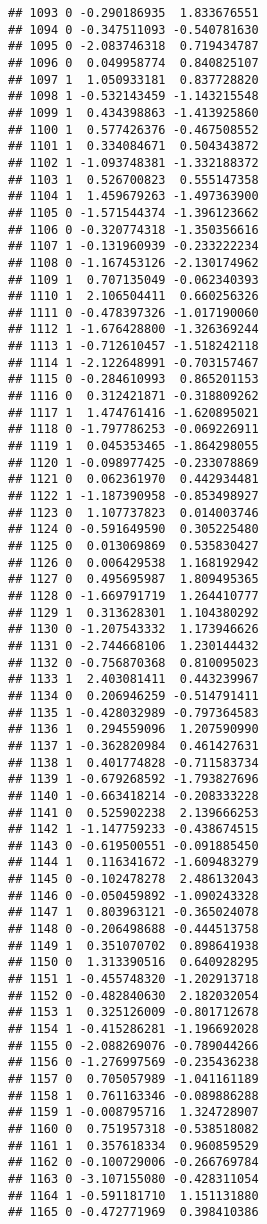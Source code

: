 \documentclass[
]{article}
\begin{document}
\begin{verbatim}
## 1093 0 -0.290186935  1.833676551
## 1094 0 -0.347511093 -0.540781630
## 1095 0 -2.083746318  0.719434787
## 1096 0  0.049958774  0.840825107
## 1097 1  1.050933181  0.837728820
## 1098 1 -0.532143459 -1.143215548
## 1099 1  0.434398863 -1.413925860
## 1100 1  0.577426376 -0.467508552
## 1101 1  0.334084671  0.504343872
## 1102 1 -1.093748381 -1.332188372
## 1103 1  0.526700823  0.555147358
## 1104 1  1.459679263 -1.497363900
## 1105 0 -1.571544374 -1.396123662
## 1106 0 -0.320774318 -1.350356616
## 1107 1 -0.131960939 -0.233222234
## 1108 0 -1.167453126 -2.130174962
## 1109 1  0.707135049 -0.062340393
## 1110 1  2.106504411  0.660256326
## 1111 0 -0.478397326 -1.017190060
## 1112 1 -1.676428800 -1.326369244
## 1113 1 -0.712610457 -1.518242118
## 1114 1 -2.122648991 -0.703157467
## 1115 0 -0.284610993  0.865201153
## 1116 0  0.312421871 -0.318809262
## 1117 1  1.474761416 -1.620895021
## 1118 0 -1.797786253 -0.069226911
## 1119 1  0.045353465 -1.864298055
## 1120 1 -0.098977425 -0.233078869
## 1121 0  0.062361970  0.442934481
## 1122 1 -1.187390958 -0.853498927
## 1123 0  1.107737823  0.014003746
## 1124 0 -0.591649590  0.305225480
## 1125 0  0.013069869  0.535830427
## 1126 0  0.006429538  1.168192942
## 1127 0  0.495695987  1.809495365
## 1128 0 -1.669791719  1.264410777
## 1129 1  0.313628301  1.104380292
## 1130 0 -1.207543332  1.173946626
## 1131 0 -2.744668106  1.230144432
## 1132 0 -0.756870368  0.810095023
## 1133 1  2.403081411  0.443239967
## 1134 0  0.206946259 -0.514791411
## 1135 1 -0.428032989 -0.797364583
## 1136 1  0.294559096  1.207590990
## 1137 1 -0.362820984  0.461427631
## 1138 1  0.401774828 -0.711583734
## 1139 1 -0.679268592 -1.793827696
## 1140 1 -0.663418214 -0.208333228
## 1141 0  0.525902238  2.139666253
## 1142 1 -1.147759233 -0.438674515
## 1143 0 -0.619500551 -0.091885450
## 1144 1  0.116341672 -1.609483279
## 1145 0 -0.102478278  2.486132043
## 1146 0 -0.050459892 -1.090243328
## 1147 1  0.803963121 -0.365024078
## 1148 0 -0.206498688 -0.444513758
## 1149 1  0.351070702  0.898641938
## 1150 0  1.313390516  0.640928295
## 1151 1 -0.455748320 -1.202913718
## 1152 0 -0.482840630  2.182032054
## 1153 1  0.325126009 -0.801712678
## 1154 1 -0.415286281 -1.196692028
## 1155 0 -2.088269076 -0.789044266
## 1156 0 -1.276997569 -0.235436238
## 1157 0  0.705057989 -1.041161189
## 1158 1  0.761163346 -0.089886288
## 1159 1 -0.008795716  1.324728907
## 1160 0  0.751957318 -0.538518082
## 1161 1  0.357618334  0.960859529
## 1162 0 -0.100729006 -0.266769784
## 1163 0 -3.107155080 -0.428311054
## 1164 1 -0.591181710  1.151131880
## 1165 0 -0.472771969  0.398410386

\end{verbatim}
\end{document}
